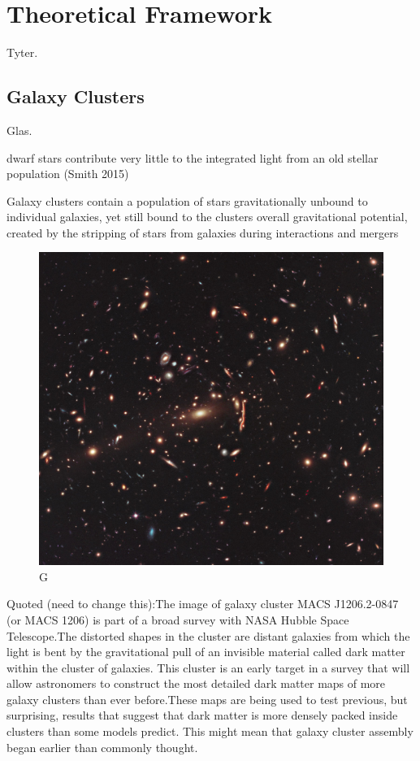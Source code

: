 \chapter{Theoretical Framework}

Tyter. 

\section{Galaxy Clusters}
 
Glas.

dwarf stars contribute very little to the integrated light from an old stellar population (Smith 2015)

Galaxy clusters contain a population of stars gravitationally unbound to individual galaxies, yet still bound to the clusters overall gravitational potential, created by the stripping of stars from galaxies during interactions and mergers

\begin{figure}[H]
\centering
\includegraphics[width=12cm]{images/GC.jpg}
\caption[M]{G}
\end{figure}

Quoted (need to change this):The image of galaxy cluster MACS J1206.2-0847 (or MACS 1206) is part of a broad survey with NASA Hubble Space Telescope.The distorted shapes in the cluster are distant galaxies from which the light is bent by the gravitational pull of an invisible material called dark matter within the cluster of galaxies. This cluster is an early target in a survey that will allow astronomers to construct the most detailed dark matter maps of more galaxy clusters than ever before.These maps are being used to test previous, but surprising, results that suggest that dark matter is more densely packed inside clusters than some models predict. This might mean that galaxy cluster assembly began earlier than commonly thought.

